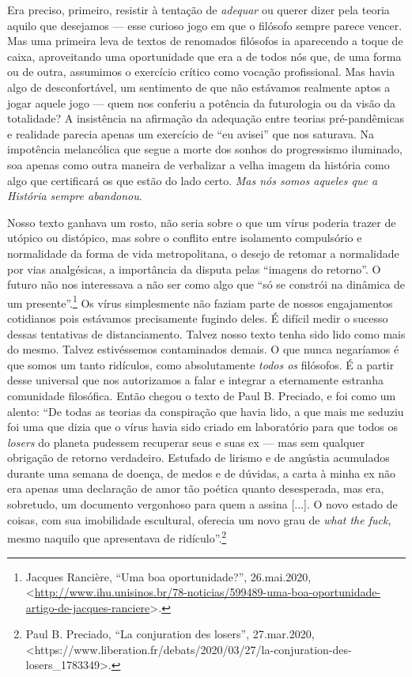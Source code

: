 Era preciso, primeiro, resistir à tentação de \emph{adequar} ou querer
dizer pela teoria aquilo que desejamos --- esse curioso jogo em que o
filósofo sempre parece vencer. Mas uma primeira leva de textos de
renomados filósofos ia aparecendo a toque de caixa, aproveitando uma
oportunidade que era a de todos nós que, de uma forma ou de outra,
assumimos o exercício crítico como vocação profissional. Mas havia algo
de desconfortável, um sentimento de que não estávamos realmente aptos a
jogar aquele jogo --- quem nos conferiu a potência da futurologia ou da
visão da totalidade? A insistência na afirmação da adequação entre
teorias pré-pandêmicas e realidade parecia apenas um exercício de ``eu
avisei'' que nos saturava. Na impotência melancólica que segue a morte
dos sonhos do progressismo iluminado, soa apenas como outra maneira de
verbalizar a velha imagem da história como algo que certificará os que
estão do lado certo. \emph{Mas nós somos aqueles que a História sempre
abandonou}.

Nosso texto ganhava um rosto, não seria sobre o que um vírus poderia
trazer de utópico ou distópico, mas sobre o conflito entre isolamento
compulsório e normalidade da forma de vida metropolitana, o desejo de
retomar a normalidade por vias analgésicas, a importância da disputa
pelas ``imagens do retorno''. O futuro não nos interessava a não ser
como algo que ``só se constrói na dinâmica de um presente''.\footnote{Jacques
  Rancière, ``Uma boa oportunidade?'', 26.mai.2020,
  \textless{}{\url{http://www.ihu.unisinos.br/78-noticias/599489-uma-boa-oportunidade-artigo-de-jacques-ranciere}\textgreater{}.}}
Os vírus simplesmente não faziam parte de nossos engajamentos cotidianos
pois estávamos precisamente fugindo deles. É difícil medir o sucesso
dessas tentativas de distanciamento. Talvez nosso texto tenha sido lido
como mais do mesmo. Talvez estivéssemos contaminados demais. O que nunca
negaríamos é que somos um tanto ridículos, como absolutamente
\emph{todos os} filósofos. É a partir desse universal que nos
autorizamos a falar e integrar a eternamente estranha comunidade
filosófica. Então chegou o texto de Paul B. Preciado, e foi como um
alento: ``De todas as teorias da conspiração que havia lido, a que mais
me seduziu foi uma que dizia que o vírus havia sido criado em
laboratório para que todos os \emph{losers} do planeta pudessem
recuperar seus e suas ex --- mas sem qualquer obrigação de retorno
verdadeiro. Estufado de lirismo e de angústia acumulados durante uma
semana de doença, de medos e de dúvidas, a carta à minha ex não era
apenas uma declaração de amor tão poética quanto desesperada, mas era,
sobretudo, um documento vergonhoso para quem a assina {[}...{]}. O novo
estado de coisas, com sua imobilidade escultural, oferecia um novo grau
de \emph{what the fuck}, mesmo naquilo que apresentava de
ridículo''.\footnote{Paul B. Preciado, ``La conjuration des losers'',
  27.mar.2020,
  \textless{}https://www.liberation.fr/debats/2020/03/27/la-conjuration-des-losers\_1783349{\textgreater{}.}}

